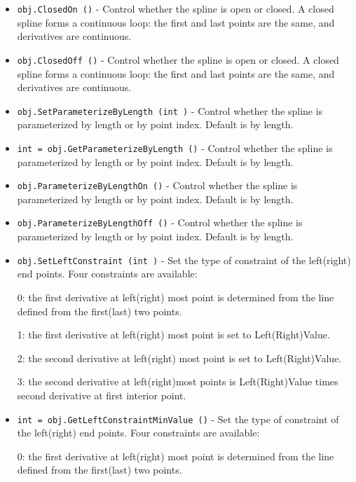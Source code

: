\begin{itemize}
\item  \verb|obj.ClosedOn ()| -  Control whether the spline is open or closed. A closed spline forms
 a continuous loop: the first and last points are the same, and
 derivatives are continuous.

\item  \verb|obj.ClosedOff ()| -  Control whether the spline is open or closed. A closed spline forms
 a continuous loop: the first and last points are the same, and
 derivatives are continuous.

\item  \verb|obj.SetParameterizeByLength (int )| -  Control whether the spline is parameterized by length or by point index.
 Default is by length.

\item  \verb|int = obj.GetParameterizeByLength ()| -  Control whether the spline is parameterized by length or by point index.
 Default is by length.

\item  \verb|obj.ParameterizeByLengthOn ()| -  Control whether the spline is parameterized by length or by point index.
 Default is by length.

\item  \verb|obj.ParameterizeByLengthOff ()| -  Control whether the spline is parameterized by length or by point index.
 Default is by length.

\item  \verb|obj.SetLeftConstraint (int )| -  Set the type of constraint of the left(right) end points. Four
 constraints are available:

 0: the first derivative at left(right) most point is determined
 from the line defined from the first(last) two points.

 1: the first derivative at left(right) most point is set to
 Left(Right)Value.
 
 2: the second derivative at left(right) most point is set to
 Left(Right)Value.
 
 3: the second derivative at left(right)most points is Left(Right)Value
 times second derivative at first interior point.

\item  \verb|int = obj.GetLeftConstraintMinValue ()| -  Set the type of constraint of the left(right) end points. Four
 constraints are available:

 0: the first derivative at left(right) most point is determined
 from the line defined from the first(last) two points.


\end{itemize}

